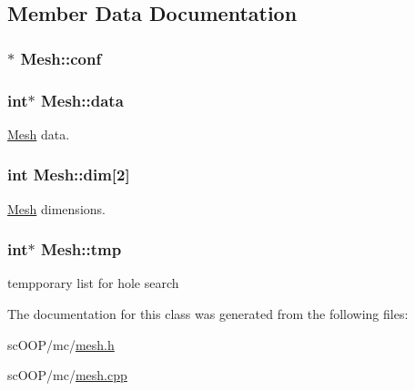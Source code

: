 \subsection{Member Data Documentation}
\hypertarget{class_mesh_aea779b6c0ade9b15e724306f0a4652de}{
\subsubsection[{conf}]{$\ast$ Mesh\+::conf\hspace{0.3cm}{\ttfamily [private]}}}\label{class_mesh_aea779b6c0ade9b15e724306f0a4652de}
\hypertarget{class_mesh_a00e5cec14c115343cc6e4b6769c5a3b3}{
\subsubsection[{data}]{\setlength{\rightskip}{0pt plus 5cm}int$\ast$ Mesh\+::data}}\label{class_mesh_a00e5cec14c115343cc6e4b6769c5a3b3}


\hyperlink{class_mesh}{Mesh} data. 

\hypertarget{class_mesh_a634550923b75db84904c094677bd415e}{
\subsubsection[{dim}]{\setlength{\rightskip}{0pt plus 5cm}int Mesh\+::dim\mbox{[}2\mbox{]}}}\label{class_mesh_a634550923b75db84904c094677bd415e}


\hyperlink{class_mesh}{Mesh} dimensions. 

\hypertarget{class_mesh_a2f5a473ab6b6f76d3dd1f2886d0da89d}{
\subsubsection[{tmp}]{\setlength{\rightskip}{0pt plus 5cm}int$\ast$ Mesh\+::tmp}}\label{class_mesh_a2f5a473ab6b6f76d3dd1f2886d0da89d}


tempporary list for hole search 



The documentation for this class was generated from the following files\+:\begin{DoxyCompactItemize}
\item 
sc\+O\+O\+P/mc/\hyperlink{mesh_8h}{mesh.\+h}\item 
sc\+O\+O\+P/mc/\hyperlink{mesh_8cpp}{mesh.\+cpp}\end{DoxyCompactItemize}
